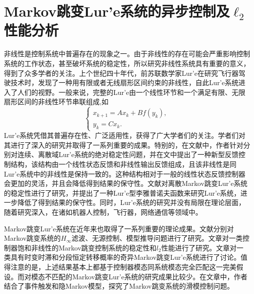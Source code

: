 
\chapter{Markov跳变Lur'e系统的异步控制及$\ell_2$性能分析}
	非线性是控制系统中普遍存在的现象之一。由于非线性的存在可能会严重影响控制系统的工作状态，甚至破坏系统的稳定性，所以研究非线性系统具有重要的意义，得到了众多学者的关注。上个世纪四十年代，前苏联数学家Lur'e在研究飞行器驾驶技术时，发现了一种用有限或者无线扇形区间约束的非线性，自此Lur'e系统\cite{lurie1957some}进入了人们的视野。一般来说，完整的Lur'e由一个线性环节和一个满足有限、无限扇形区间的非线性环节串联组成\cite{khalil2002nonlinear},如
	\begin{equation}
		\left\{
			\begin{array}{lr}
			x_{k+1}=Ax_k+Bf(y_k),\\
			y_k=Cx_k.
			\end{array}
		\right.
	\end{equation}
	Lur'e系统凭借其普遍存在性、广泛适用性，获得了广大学者们的关注。学者们对其进行了深入的研究并取得了一系列重要的成果\cite{kalman1963lyapunov,park2002stability,suykens1997nonlinear,cao2005synchronization}。特别的，在文献\cite{castelan2006absolute,castelan2008control}中，作者针对分别对连续、离散域Lur'e系统的绝对稳定性问题，并在文中提出了一种新型反馈控制结构，该结构由一个线性状态反馈和非线性输出反馈组成，且该非线性是同Lur'e系统中的非线性是保持一致的。这种结构相对于一般的线性状态反馈控制器会更加的灵活，并且会降低得到结果的保守性。文献\cite{gonzaga2012stability}对离散Markov跳变Lur'e系统的稳定性进行了研究，并提出了一种Lur'e型李雅普诺夫函数来研究Lur'e系统，进一步降低了得到结果的保守性。同时，Lur'e系统的研究并没有局限在理论层面，随着研究深入，在诸如机器人控制\cite{mahmoud1994globally,chen1999controlling}，飞行器\cite{leonov2012aircraft}，网络通信\cite{li2006stability}等领域中。
	
	Markov跳变Lur'e系统在近年来也取得了一系列重要的理论成果。文献\cite{zhu2015distributed,zhang2017resilient,zhang2015model}分别对Markov跳变系统的$H_\infty$滤波、无源控制、模型推导问题进行了研究。文章\cite{gonzaga2014stochastic,song2012stability}对一类控制器饱和非线性的Markov跳变控制系统的稳定性和$l_2$性能进行了研究。文章\cite{wu2012stochastic}对一类具有时变时滞和分段恒定转移概率的奇异Markov跳变Lur'e系统进行了讨论。值得注意的是，上述结果基本上都基于控制器模态同系统模态完全匹配这一完美假设。而对模态不匹配的Markov跳变Lur'e系统的研究成果比较少。在文章\cite{song2018event}中，作者结合了事件触发和隐Markov模型，探究了Markov跳变系统的滑模控制问题。
	
